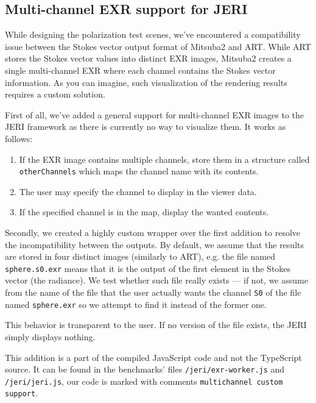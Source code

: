 \subsection{Multi-channel EXR support for JERI}
\label{sec:multichannel_jeri}

While designing the polarization test scenes, we've encountered a compatibility issue between the Stokes vector output format of Mitsuba2 and ART. While ART stores the Stokes vector values into distinct EXR images, Mitsuba2 creates a single multi-channel EXR where each channel contains the Stokes vector information. As you can imagine, such visualization of the rendering results requires a custom solution.

First of all, we've added a general support for multi-channel EXR images to the JERI framework as there is currently no way to visualize them. It works as follows:

\begin{enumerate}
	\item If the EXR image contains multiple channels, store them in a structure called \texttt{otherChannels} which maps the channel name with its contents.
	\item The user may specify the channel to display in the viewer data.
	\item If the specified channel is in the map, display the wanted contents.
\end{enumerate}

Secondly, we created a highly custom wrapper over the first addition to resolve the incompatibility between the outputs. By default, we assume that the results are stored in four distinct images (similarly to ART), e.g. the file named \texttt{sphere.s0.exr} means that it is the output of the first element in the Stokes vector (the radiance). We test whether such file really exists --- if not, we assume from the name of the file that the user actually wants the channel \texttt{S0} of the file named \texttt{sphere.exr} so we attempt to find it instead of the former one.

This behavior is transparent to the user. If no version of the file exists, the JERI simply displays nothing.

This addition is a part of the compiled JavaScript code and not the TypeScript source. It can be found in the benchmarks' files \texttt{/jeri/exr-worker.js} and \texttt{/jeri/jeri.js}, our code is marked with comments \texttt{multichannel custom support}.